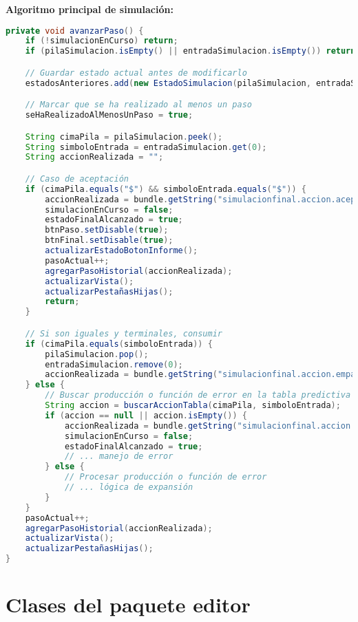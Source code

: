 \textbf{Algoritmo principal de simulación:}

\begin{lstlisting}[language=Java, caption=Algoritmo principal de simulación paso a paso]
private void avanzarPaso() {
    if (!simulacionEnCurso) return;
    if (pilaSimulacion.isEmpty() || entradaSimulacion.isEmpty()) return;

    // Guardar estado actual antes de modificarlo
    estadosAnteriores.add(new EstadoSimulacion(pilaSimulacion, entradaSimulacion, ""));

    // Marcar que se ha realizado al menos un paso
    seHaRealizadoAlMenosUnPaso = true;

    String cimaPila = pilaSimulacion.peek();
    String simboloEntrada = entradaSimulacion.get(0);
    String accionRealizada = "";

    // Caso de aceptación
    if (cimaPila.equals("$") && simboloEntrada.equals("$")) {
        accionRealizada = bundle.getString("simulacionfinal.accion.aceptar");
        simulacionEnCurso = false;
        estadoFinalAlcanzado = true;
        btnPaso.setDisable(true);
        btnFinal.setDisable(true);
        actualizarEstadoBotonInforme();
        pasoActual++;
        agregarPasoHistorial(accionRealizada);
        actualizarVista();
        actualizarPestañasHijas();
        return;
    }

    // Si son iguales y terminales, consumir
    if (cimaPila.equals(simboloEntrada)) {
        pilaSimulacion.pop();
        entradaSimulacion.remove(0);
        accionRealizada = bundle.getString("simulacionfinal.accion.emparejar");
    } else {
        // Buscar producción o función de error en la tabla predictiva
        String accion = buscarAccionTabla(cimaPila, simboloEntrada);
        if (accion == null || accion.isEmpty()) {
            accionRealizada = bundle.getString("simulacionfinal.accion.error");
            simulacionEnCurso = false;
            estadoFinalAlcanzado = true;
            // ... manejo de error
        } else {
            // Procesar producción o función de error
            // ... lógica de expansión
        }
    }
    pasoActual++;
    agregarPasoHistorial(accionRealizada);
    actualizarVista();
    actualizarPestañasHijas();
}
\end{lstlisting}

\section{Clases del paquete editor}

